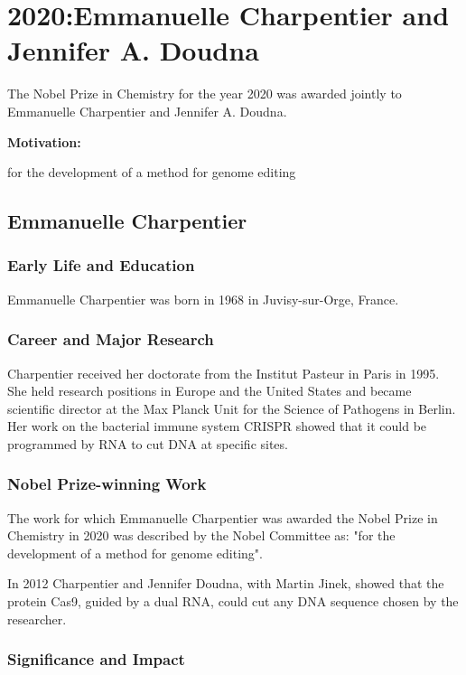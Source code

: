 \chapter{2020:Emmanuelle Charpentier and Jennifer A. Doudna}

\label{chap:chemistry2020}

The Nobel Prize in Chemistry for the year 2020 was awarded jointly to Emmanuelle Charpentier and Jennifer A. Doudna.

\textbf{Motivation:}

for the development of a method for genome editing

\section{Emmanuelle Charpentier}

\subsection*{Early Life and Education}

Emmanuelle Charpentier was born in 1968 in Juvisy-sur-Orge, France.

\subsection*{Career and Major Research}

Charpentier received her doctorate from the Institut Pasteur in Paris in 1995. She held research positions in Europe and the United States and became scientific director at the Max Planck Unit for the Science of Pathogens in Berlin. Her work on the bacterial immune system CRISPR showed that it could be programmed by RNA to cut DNA at specific sites.

\subsection*{Nobel Prize-winning Work}

The work for which Emmanuelle Charpentier was awarded the Nobel Prize in Chemistry in 2020 was described by the Nobel Committee as: "for the development of a method for genome editing".

In 2012 Charpentier and Jennifer Doudna, with Martin Jinek, showed that the protein Cas9, guided by a dual RNA, could cut any DNA sequence chosen by the researcher.

\subsection*{Significance and Impact}

